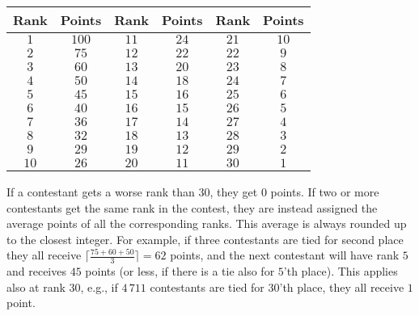 \begin{center}
\begin{tabular}{|c|c|||c|c|||c|c|}
    \hline
    \textbf{Rank} & \textbf{Points} &  \textbf{Rank} & \textbf{Points} & \textbf{Rank} & \textbf{Points} \\ \hline
    $1$ & $100$ & $11$ & $24$ & $21$ & $10$\\ \hline
    $2$ & $75$ & $12$ & $22$ & $22$ & $9$\\ \hline
    $3$ & $60$ & $13$ & $20$ & $23$ & $8$\\ \hline
    $4$ & $50$ & $14$ & $18$ & $24$ & $7$\\ \hline
    $5$ & $45$ & $15$ & $16$ & $25$ & $6$\\ \hline
    $6$ & $40$ & $16$ & $15$ & $26$ & $5$\\ \hline
    $7$ & $36$ & $17$ & $14$ & $27$ & $4$\\ \hline
    $8$ & $32$ & $18$ & $13$ & $28$ & $3$\\ \hline
    $9$ & $29$ & $19$ & $12$ & $29$ & $2$\\ \hline
    $10$ & $26$ & $20$ & $11$ & $30$ & $1$\\ \hline
\end{tabular}
\end{center}
\noindent
If a contestant gets a worse rank than $30$, they get $0$ points.  If
two or more contestants get the same rank in the contest, they are
instead assigned the average points of all the corresponding ranks.
This average is always rounded up to the closest integer.  For
example, if three contestants are tied for second place they all
receive $\lceil \frac{75 + 60 + 50}{3} \rceil = 62$ points, and the
next contestant will have rank $5$ and receives $45$ points (or less,
if there is a tie also for $5$'th place).  This applies also at rank
$30$, e.g., if $4\,711$ contestants are tied for $30$'th place, they
all receive $1$ point.

